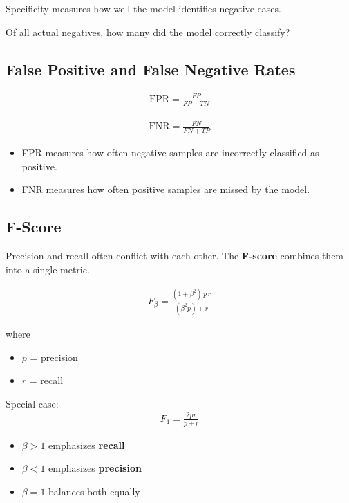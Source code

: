 \documentclass[10pt,a4paper]{article}
\begin{document}
	Specificity measures how well the model identifies negative cases.

	\begin{center}
		Of all actual negatives, how many did the model correctly classify?
	\end{center}

	\subsection{False Positive and False Negative Rates}

	\begin{align*}
			\text{FPR} = \frac{FP}{FP+TN}
	\end{align*}

	\begin{align*}
			\text{FNR} = \frac{FN}{FN+TP}
	\end{align*}


	\begin{itemize}
		\item FPR measures how often negative samples are incorrectly classified as positive.
		\item FNR measures how often positive samples are missed by the model.
	\end{itemize}

	\subsection{F-Score}

	Precision and recall often conflict with each other.
	The \textbf{F-score} combines them into a single metric.

	\begin{align*}
			F_{\beta} = \frac{(1+\beta^2)\, p\, r}{(\beta^2 p)+r}
	\end{align*}

	where

	\begin{itemize}
		\item $p$ = precision
		\item $r$ = recall
	\end{itemize}

	Special case:
	\begin{align*}
			F_1 = \frac{2pr}{p+r}
	\end{align*}


	\begin{itemize}
		\item $\beta > 1$ emphasizes \textbf{recall}
		\item $\beta < 1$ emphasizes \textbf{precision}
		\item $\beta = 1$ balances both equally
	\end{itemize}
\end{document}

